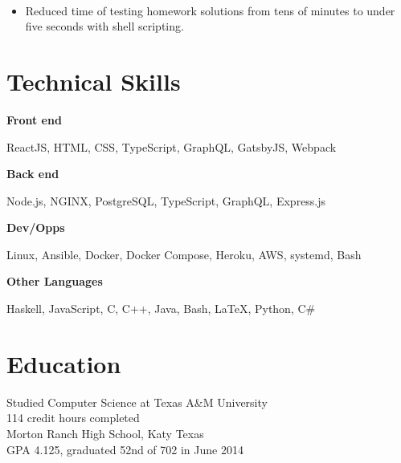 \documentclass{resume}
\begin{document}
 \\

\begin{itemize}
    \item Reduced time of testing homework solutions from tens of minutes to
          under five seconds with shell scripting.
\end{itemize}

\section{Technical Skills}

\textbf{Front end}

ReactJS, HTML, CSS, TypeScript, GraphQL, GatsbyJS, Webpack

\textbf{Back end}

Node.js, NGINX, PostgreSQL, TypeScript, GraphQL, Express.js

\textbf{Dev/Opps}

Linux, Ansible, Docker, Docker Compose, Heroku, AWS, systemd, Bash

\textbf{Other Languages}

Haskell, JavaScript, C, C++, Java, Bash, \LaTeX, Python, C\#

\section{Education}

Studied Computer Science at Texas A\&M University\\
114 credit hours completed\\[1em]
Morton Ranch High School, Katy Texas\\
GPA 4.125, graduated 52nd of 702 in June 2014
\end{document}

